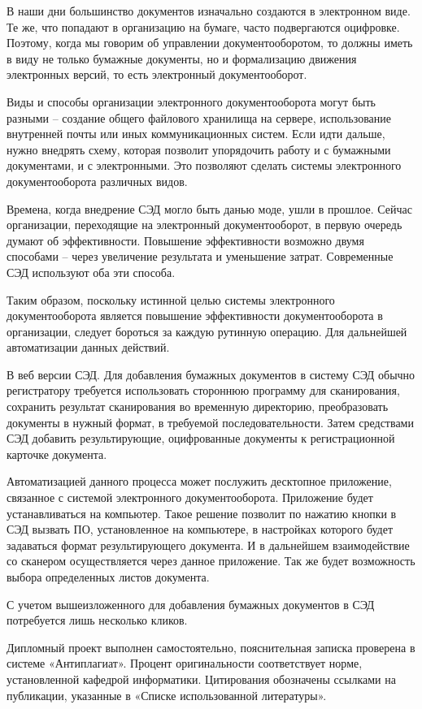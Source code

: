 
В наши дни большинство документов изначально создаются в электронном виде. Те же, что попадают в организацию на бумаге, часто подвергаются оцифровке. Поэтому, когда мы говорим об управлении документооборотом, то должны иметь в виду не только бумажные документы, но и формализацию движения электронных версий, то есть электронный документооборот. 

Виды и способы организации электронного документооборота могут быть разными – создание общего файлового хранилища на сервере, использование внутренней почты или иных коммуникационных систем. Если идти дальше, нужно внедрять схему, которая позволит упорядочить работу и с бумажными документами, и с электронными. Это позволяют сделать системы электронного документооборота различных видов.

Времена, когда внедрение СЭД могло быть данью моде, ушли в прошлое. Сейчас организации, переходящие на электронный документооборот, в первую очередь думают об эффективности. Повышение эффективности возможно двумя способами – через увеличение результата и уменьшение затрат. Современные СЭД используют оба эти способа.

Таким образом, поскольку истинной целью системы электронного документооборота является повышение эффективности документооборота в организации, следует бороться за каждую рутинную операцию. Для дальнейшей автоматизации данных действий.

В веб версии СЭД. Для добавления бумажных документов в систему СЭД обычно регистратору требуется использовать стороннюю программу для сканирования, сохранить результат сканирования во временную директорию, преобразовать документы в нужный формат, в требуемой последовательности. Затем средствами СЭД добавить результирующие, оцифрованные документы к регистрационной карточке документа.

Автоматизацией данного процесса может послужить десктопное приложение, связанное с системой электронного документооборота. Приложение будет устанавливаться на компьютер. Такое решение позволит по нажатию кнопки в СЭД вызвать ПО, установленное на компьютере, в настройках которого будет задаваться формат результирующего документа. И в дальнейшем взаимодействие со сканером осуществляется через данное приложение. Так же будет возможность выбора определенных листов документа.

С учетом вышеизложенного для добавления бумажных документов в СЭД потребуется лишь несколько кликов.

Дипломный проект выполнен самостоятельно, пояснительная записка проверена в системе «Антиплагиат». Процент оригинальности соответствует норме, установленной кафедрой информатики. Цитирования обозначены ссылками на публикации, указанные в «Списке использованной литературы».
